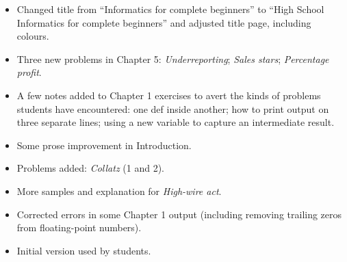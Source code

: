 {
\begin{itemize}
  \item Changed title from ``Informatics for complete beginners'' to ``High School
    Informatics for complete beginners'' and adjusted title page, including colours.
  \item Three new problems in Chapter 5: \emph{Underreporting}; \emph{Sales stars};
    \emph{Percentage profit}.
\end{itemize}

\begin{itemize}
  \item A few notes added to Chapter 1 exercises to avert the kinds of problems students
    have encountered: one def inside another; how to print output on three separate lines;
    using a new variable to capture an intermediate result.
  \item Some prose improvement in Introduction.
  \item Problems added: \emph{Collatz} (1 and 2).
  \item More samples and explanation for \emph{High-wire act}.
  \item Corrected errors in some Chapter 1 output (including removing trailing zeros from
    floating-point numbers).
\end{itemize}

\begin{itemize}
  \item Initial version used by students.
\end{itemize}

}

